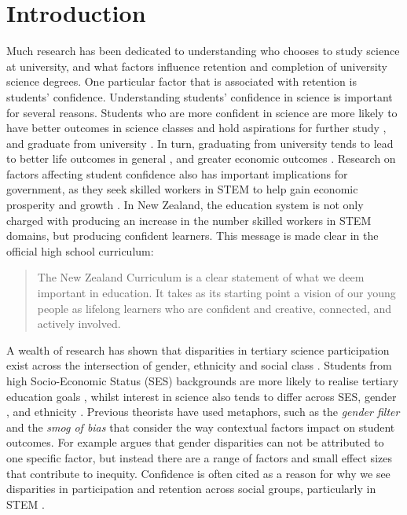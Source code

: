 \section*{Introduction}
\label{intro}
Much research has been dedicated to understanding who chooses to study science at university, and what factors influence retention and completion of university science degrees. One particular factor that is associated with retention is students' confidence. Understanding students' confidence in science is important for several reasons. Students who are more confident in science are more likely to have better outcomes in science classes \cite{uccar2017role, tighezza2014modeling, chang2008science, peters2013examining} and hold aspirations for further study \cite{mujtaba2018students}, and graduate from university \cite{larson2015predicting}. In turn, graduating from university tends to lead to better life outcomes in general \cite{Oreopoulos_2007}, and greater economic outcomes \cite{norton2016mapping, mahoney2013moving}. Research on factors affecting student confidence also has important implications for government, as they seek skilled workers in STEM to help gain economic prosperity and growth \cite{pricewaterhousecoopers2015smart}. In New Zealand, the education system is not only charged with producing an increase in the number skilled workers in STEM domains, but producing confident learners. This message is made clear in the official high school curriculum:
\begin{quote}
   The New Zealand Curriculum is a clear statement of what we deem important in education. It takes as its starting point a vision of our young people as lifelong learners who are confident and creative, connected, and actively involved.
\end{quote} \cite{NZC}

A wealth of research has shown that disparities in tertiary science participation exist across the intersection of gender, ethnicity and social class \cite{reynolds2011change, meehan2017explaining}. Students from high Socio-Economic Status (SES) backgrounds are more likely to realise tertiary education goals \cite{reynolds2011change}, whilst interest in science also tends to differ across SES, gender \cite{cheryan2017some}, and ethnicity \cite{Wong2016ScienceStudents}. Previous theorists have used metaphors, such as the \textit{gender filter} \cite{Blickenstaff_2005} and the \textit{smog of bias} \cite{Kost_Smith_2010} that consider the way contextual factors impact on student outcomes. For example \cite{Kost_Smith_2010} argues that gender disparities can not be attributed to one specific factor, but instead there are a range of factors and small effect sizes that contribute to inequity. Confidence is often cited as a reason for why we see disparities in participation and retention across social groups, particularly in STEM \cite{Blickenstaff_2005}.  

